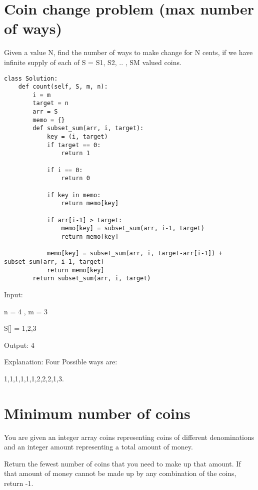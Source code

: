 \documentclass[24pt, a4]{article}
\begin{document}
\newpage
\section{Coin change problem (max number of ways)}
Given a value N, find the number of ways to make change for N cents, if we have infinite supply of each of S = { S1, S2, .. , SM } valued coins.
\begin{lstlisting}
class Solution:
    def count(self, S, m, n): 
        i = m
        target = n
        arr = S
        memo = {}
        def subset_sum(arr, i, target):
            key = (i, target)
            if target == 0:
                return 1
            
            if i == 0:
                return 0
            
            if key in memo:
                return memo[key]
            
            if arr[i-1] > target:
                memo[key] = subset_sum(arr, i-1, target)
                return memo[key]

            memo[key] = subset_sum(arr, i, target-arr[i-1]) + subset_sum(arr, i-1, target)
            return memo[key]
        return subset_sum(arr, i, target)
\end{lstlisting}
Input:

n = 4 , m = 3

S[] = {1,2,3}

Output: 4

Explanation: Four Possible ways are:

{1,1,1,1},{1,1,2},{2,2},{1,3}.

\newpage
\section{Minimum number of coins}
You are given an integer array coins representing coins of different denominations and an integer amount representing a total amount of money.

Return the fewest number of coins that you need to make up that amount. If that amount of money cannot be made up by any combination of the coins, return -1.
\end{document}
